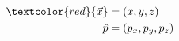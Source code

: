 \documentclass[preview]{standalone}
\begin{document}
\begin{align*}
\begin{aligned} \textcolor{red}{\vec{x}} &=(x,y,z) \\ \hat{p} &= (p_x, p_y, p_z) \end{aligned}
\end{align*}
\end{document}
